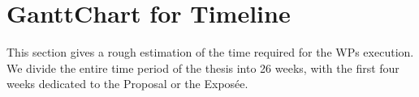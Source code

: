 \section{GanttChart for Timeline}
\label{timeline:section:gc}
	


This section gives a rough estimation of the time required for the WPs execution.
We divide the entire time period of the thesis into 26 weeks, with the first four weeks dedicated to the Proposal or the Exposée.

